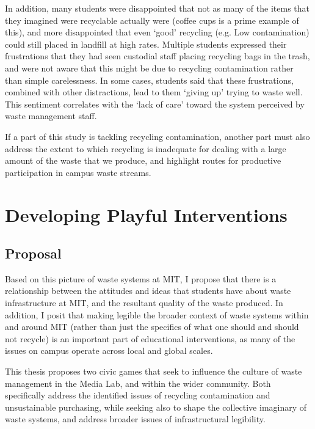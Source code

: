\documentclass[nofonts,nols,justified,nobib]{tufte-book}
\begin{document}
In addition, many students were disappointed that not as many of the items that they imagined were recyclable actually were (coffee cups is a prime example of this), and more disappointed that even `good' recycling (e.g. Low contamination) could still placed in landfill at high rates. Multiple students expressed their frustrations that they had seen custodial staff placing recycling bags in the trash, and were not aware that this might be due to recycling contamination rather than simple carelessness. In some cases, students said that these frustrations, combined with other distractions, lead to them `giving up' trying to waste well. This sentiment correlates with the `lack of care' toward the system perceived by waste management staff.


If a part of this study is tackling recycling contamination, another part must also address the extent to which recycling is inadequate for dealing with a large amount of the waste that we produce, and highlight routes for productive participation in campus waste streams.


\chapter{Developing Playful Interventions}

\section*{Proposal}

Based on this picture of waste systems at MIT, I propose that there is a relationship between the attitudes and ideas that students have about waste infrastructure at MIT, and the resultant quality of the waste produced. In addition, I posit that making legible the broader context of waste systems within and around MIT (rather than just the specifics of what one should and should not recycle) is an important part of educational interventions, as many of the issues on campus operate across local and global scales.

This thesis proposes two civic games that seek to influence the culture of waste management in the Media Lab, and within the wider community. Both specifically address the identified issues of recycling contamination and unsustainable purchasing, while seeking also to shape the collective imaginary of waste systems, and address broader issues of infrastructural legibility. 
\end{document}
